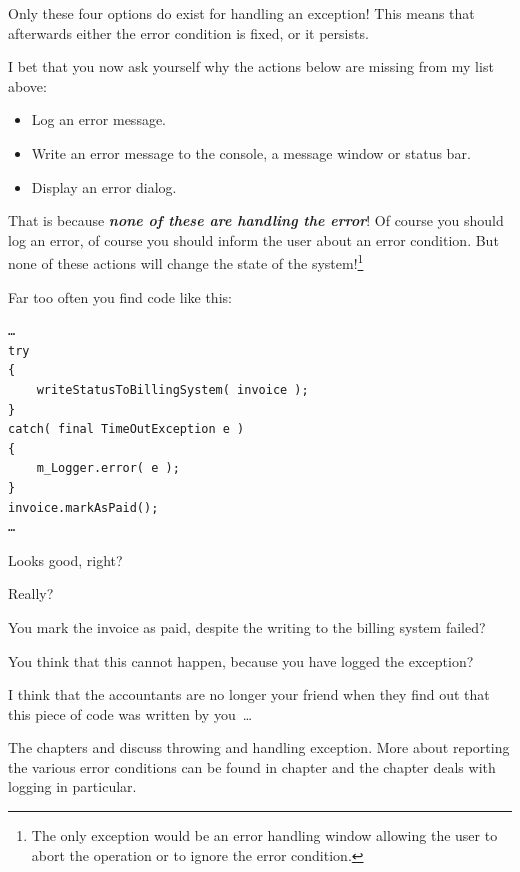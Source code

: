 Only these four options do exist for handling an exception! This means that afterwards either the error condition is fixed, or it persists.

I bet that you now ask yourself why the actions below are missing from my list above:
\begin{itemize}
\item{Log an error message.}
\item{Write an error message to the console, a message window or status bar.}
\item{Display an error dialog.}
\end{itemize}

That is because \textit{\textbf{none of these are handling the error}}! Of course you should log an error, of course you should inform the user about an error condition. But none of these actions will change the state of the system!\footnote{The only exception would be an error handling window allowing the user to abort the operation or to ignore the error condition.}

Far too often you find code like this:
\begin{lstlisting}
…
try
{
    writeStatusToBillingSystem( invoice );
}
catch( final TimeOutException e )
{
    m_Logger.error( e );
}
invoice.markAsPaid();
…
\end{lstlisting}

Looks good, right?

Really?

You mark the invoice as paid, despite the writing to the billing system failed?

You think that this cannot happen, because you have logged the exception?

I think that the accountants are no longer your friend when they find out that this piece of code was written by you~…

The chapters  and  discuss throwing and handling exception. More about reporting the various error conditions can be found in chapter  and the chapter  deals with logging in particular.





